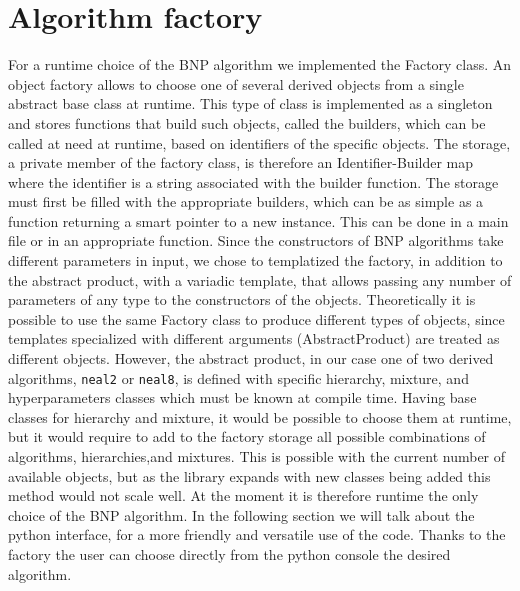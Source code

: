 \section{Algorithm factory}
For a runtime choice of the BNP algorithm we implemented the Factory class.
An object factory allows to choose one of several derived objects from a single abstract base class at runtime.  This type of class is implemented as a singleton and stores functions that build such objects, called the builders, which can be called at need at runtime, based on identifiers of the specific objects. The storage, a private member of the factory class, is therefore an Identifier-Builder map where the identifier is a string associated with the builder function.
 The storage must first be filled with the appropriate builders, which can be as simple as a function returning a smart pointer to a new instance. This can be done in a main file or in an appropriate function.
Since the constructors of BNP algorithms take different parameters in input, we chose to templatized the factory, in addition to the abstract product, with a variadic template, that allows passing any number of parameters of any type to the constructors of the objects.
Theoretically it is possible to use the same Factory class to produce different types of objects, since templates specialized with different arguments (AbstractProduct) are treated as different objects.
However, the abstract product, in our case one of two derived algorithms, \verb|neal2| or \verb|neal8|, is defined with specific hierarchy, mixture, and hyperparameters classes which must be known at compile time. Having base classes for hierarchy and mixture, it would be possible to choose them at runtime, but it would require to add to the factory storage all possible combinations of algorithms, hierarchies,and mixtures.
This is possible with the current number of available objects, but as the library expands with new classes being added this method would not scale well.
At the moment it is therefore runtime the only choice of the BNP algorithm.
In the following section we will talk about the python interface, for a more friendly and versatile use of the code. Thanks to the factory the user can choose directly from the python console the desired algorithm.
